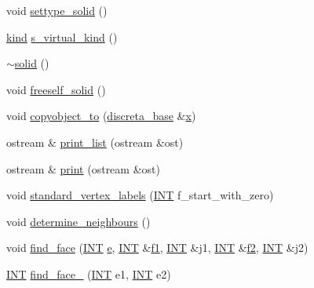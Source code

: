 \begin{DoxyCompactItemize}
\item 
void \mbox{\hyperlink{classsolid_a775bd4821f75a8aee4ea3d4335ff90e0}{settype\+\_\+solid}} ()
\item 
\mbox{\hyperlink{discreta_8h_aaf25ee7e2306d78c74ec7bc48f092e81}{kind}} \mbox{\hyperlink{classsolid_aae18938e9f7d9784734fe72e8d3223a7}{s\+\_\+virtual\+\_\+kind}} ()
\item 
\mbox{\hyperlink{classsolid_a9c9476c0078fe49bf5e19c4297b2f16d}{$\sim$solid}} ()
\item 
void \mbox{\hyperlink{classsolid_a84c2f0abd7b24b1cf2ccefa9c99567fe}{freeself\+\_\+solid}} ()
\item 
void \mbox{\hyperlink{classsolid_a7f35a904885ef626d1a74663fe2cad62}{copyobject\+\_\+to}} (\mbox{\hyperlink{classdiscreta__base}{discreta\+\_\+base}} \&\mbox{\hyperlink{classsolid_ab9c0f7598fe0b626a7f819d04b935996}{x}})
\item 
ostream \& \mbox{\hyperlink{classsolid_a2a8cb93b481e1876260e7b8739cf4695}{print\+\_\+list}} (ostream \&ost)
\item 
ostream \& \mbox{\hyperlink{classsolid_a0afe4403778d31d092e2a66c13a9a365}{print}} (ostream \&ost)
\item 
void \mbox{\hyperlink{classsolid_abd47abc26a30fdb78e452b0a519b3076}{standard\+\_\+vertex\+\_\+labels}} (\mbox{\hyperlink{galois_8h_a09fddde158a3a20bd2dcadb609de11dc}{I\+NT}} f\+\_\+start\+\_\+with\+\_\+zero)
\item 
void \mbox{\hyperlink{classsolid_ad6bcabc7a3e9082b4baef371e7828c27}{determine\+\_\+neighbours}} ()
\item 
void \mbox{\hyperlink{classsolid_af71537b1f01c068f1d1517c523a72544}{find\+\_\+face}} (\mbox{\hyperlink{galois_8h_a09fddde158a3a20bd2dcadb609de11dc}{I\+NT}} \mbox{\hyperlink{alphabet2_8_c_a88859ce72faebb79ea0a2bca00a0f46b}{e}}, \mbox{\hyperlink{galois_8h_a09fddde158a3a20bd2dcadb609de11dc}{I\+NT}} \&\mbox{\hyperlink{classsolid_a496eea5cdbcc2e61784e736bb4e06d1d}{f1}}, \mbox{\hyperlink{galois_8h_a09fddde158a3a20bd2dcadb609de11dc}{I\+NT}} \&j1, \mbox{\hyperlink{galois_8h_a09fddde158a3a20bd2dcadb609de11dc}{I\+NT}} \&\mbox{\hyperlink{classsolid_a52b43d36c47cf4f57fd277c408d33d58}{f2}}, \mbox{\hyperlink{galois_8h_a09fddde158a3a20bd2dcadb609de11dc}{I\+NT}} \&j2)
\item 
\mbox{\hyperlink{galois_8h_a09fddde158a3a20bd2dcadb609de11dc}{I\+NT}} \mbox{\hyperlink{classsolid_af5173d277b17d5fe76c6dc39c3b863b7}{find\+\_\+face\+\_}} (\mbox{\hyperlink{galois_8h_a09fddde158a3a20bd2dcadb609de11dc}{I\+NT}} e1, \mbox{\hyperlink{galois_8h_a09fddde158a3a20bd2dcadb609de11dc}{I\+NT}} e2)

\end{DoxyCompactItemize}
